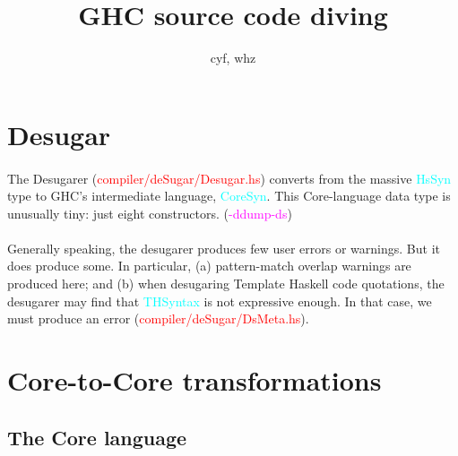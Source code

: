 \documentclass{article}
\author{cyf, whz}
\title{GHC source code diving}
\begin{document}
	\maketitle
	\section{Desugar}
	\paragraph{}
	The Desugarer (\textcolor{red}{compiler/deSugar/Desugar.hs}) converts from the massive \textcolor{cyan}{HsSyn} type to GHC's intermediate language, \textcolor{cyan}{CoreSyn}. This Core-language data type is unusually tiny: just eight constructors. (\textcolor{magenta}{-ddump-ds})
	\paragraph{}
	Generally speaking, the desugarer produces few user errors or warnings. But it does produce some. In particular, (a) pattern-match overlap warnings are produced here; and (b) when desugaring Template Haskell code quotations, the desugarer may find that \textcolor{cyan}{THSyntax} is not expressive enough. In that case, we must produce an error (\textcolor{red}{compiler/deSugar/DsMeta.hs}).
	\section{Core-to-Core transformations}
	\subsection{The Core language}
\end{document}
